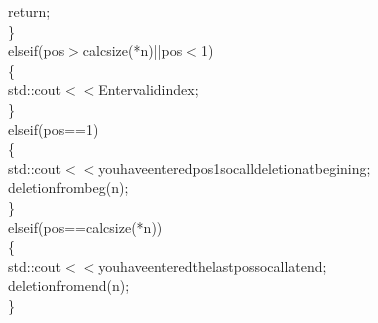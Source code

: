 \documentclass[a4paper, 9pt]{article}
\newcommand\SPC{\hspace*{0.6em}}
\newcommand\TAB{\hspace*{1.2em}}
\newcommand\QOT{\mbox{\char 34}}
\newcommand{\CppAIdentifier}[1]{\textcolor[rgb]{0.88,0.89,0.89}{#1}}
\newcommand{\CppANumber}[1]{\textcolor[rgb]{1,0.8,0.13}{#1}}
\newcommand{\CppAReservedWord}[1]{\textcolor[rgb]{0.4,0.55,0.69}{#1}}
\newcommand{\CppASpace}[1]{\colorbox[rgb]{0.16,0.19,0.2}{#1}}
\newcommand{\CppAString}[1]{\textcolor[rgb]{0.93,0.46,0}{#1}}
\newcommand{\CppASymbol}[1]{\textcolor[rgb]{0.91,0.89,0.72}{#1}}
\begin{document}
\begin{ttfamily}
\CppASpace{\TAB \TAB \TAB }\CppAReservedWord{return}\CppASymbol{;}\\
\CppASpace{\TAB \TAB \SPC }\CppASymbol{\}}\\
\CppASpace{\TAB \TAB }\CppAReservedWord{else}\CppASpace{\SPC }\CppAReservedWord{if}\CppASymbol{(}\CppAIdentifier{pos}\CppASymbol{$>$}\CppAIdentifier{calcsize}\CppASymbol{(}\CppASymbol{*}\CppAIdentifier{n}\CppASymbol{)}\CppASymbol{||}\CppAIdentifier{pos}\CppASymbol{$<$}\CppANumber{1}\CppASymbol{)}\\
\CppASpace{\TAB \TAB }\CppASymbol{\{}\\
\CppASpace{\TAB \TAB \TAB }\CppAIdentifier{std}\CppASymbol{::}\CppAIdentifier{cout}\CppASymbol{$<$$<$}\CppAString{\QOT Enter\SPC valid\SPC index\QOT }\CppASymbol{;}\\
\CppASpace{\TAB \TAB }\CppASymbol{\}}\CppASpace{\TAB }\\
\CppASpace{\TAB \TAB \SPC }\CppAReservedWord{else}\CppASpace{\SPC }\CppAReservedWord{if}\CppASymbol{(}\CppAIdentifier{pos}\CppASpace{\SPC }\CppASymbol{==}\CppASpace{\SPC }\CppANumber{1}\CppASymbol{)}\\
\CppASpace{\TAB \TAB }\CppASymbol{\{}\\
\CppASpace{\TAB \TAB \TAB }\CppAIdentifier{std}\CppASymbol{::}\CppAIdentifier{cout}\CppASymbol{$<$$<$}\CppAString{\QOT you\SPC have\SPC entered\SPC pos\SPC 1\SPC so\SPC call\SPC deletion\SPC at\SPC begining\QOT }\CppASymbol{;}\\
\CppASpace{\TAB \TAB \TAB \TAB \TAB }\CppAIdentifier{deletionfrombeg}\CppASymbol{(}\CppAIdentifier{n}\CppASymbol{)}\CppASymbol{;}\\
\CppASpace{\TAB \TAB }\CppASymbol{\}}\\
\CppASpace{\TAB \TAB }\CppAReservedWord{else}\CppASpace{\SPC }\CppAReservedWord{if}\CppASymbol{(}\CppAIdentifier{pos}\CppASymbol{==}\CppAIdentifier{calcsize}\CppASymbol{(}\CppASymbol{*}\CppAIdentifier{n}\CppASymbol{)}\CppASymbol{)}\\
\CppASpace{\TAB \TAB }\CppASymbol{\{}\\
\CppASpace{\TAB \TAB \TAB \TAB }\CppAIdentifier{std}\CppASymbol{::}\CppAIdentifier{cout}\CppASymbol{$<$$<$}\CppAString{\QOT you\SPC have\SPC entered\SPC the\SPC last\SPC pos\SPC so\SPC call\SPC \SPC at\SPC end\QOT }\CppASymbol{;}\\
\CppASpace{\TAB \TAB \TAB \TAB }\CppAIdentifier{deletionfromend}\CppASymbol{(}\CppAIdentifier{n}\CppASymbol{)}\CppASymbol{;}\\
\CppASpace{\TAB \TAB }\CppASymbol{\}}\\

\end{ttfamily}
\end{document}
